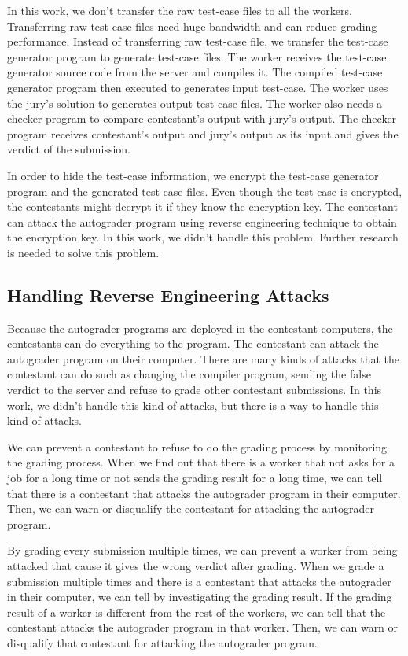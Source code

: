 \documentclass[conference]{IEEEtran}
\begin{document}
In this work, we don't transfer the raw test-case files to all the workers. Transferring raw test-case files need huge bandwidth and can reduce grading performance. Instead of transferring raw test-case file, we transfer the test-case generator program to generate test-case files. The worker receives the test-case generator source code from the server and compiles it. The compiled test-case generator program then executed to generates input test-case. The worker uses the jury's solution to generates output test-case files. The worker also needs a checker program to compare contestant's output with jury's output. The checker program receives contestant's output and jury's output as its input and gives the verdict of the submission.

In order to hide the test-case information, we encrypt the test-case generator program and the generated test-case files. Even though the test-case is encrypted, the contestants might decrypt it if they know the encryption key. The contestant can attack the autograder program using reverse engineering technique to obtain the encryption key. In this work, we didn't handle this problem. Further research is needed to solve this problem.

\subsection{Handling Reverse Engineering Attacks}

Because the autograder programs are deployed in the contestant computers, the contestants can do everything to the program. The contestant can attack the autograder program on their computer. There are many kinds of attacks that the contestant can do such as changing the compiler program, sending the false verdict to the server and refuse to grade other contestant submissions. In this work, we didn't handle this kind of attacks, but there is a way to handle this kind of attacks.

We can prevent a contestant to refuse to do the grading process by monitoring the grading process. When we find out that there is a worker that not asks for a job for a long time or not sends the grading result for a long time, we can tell that there is a contestant that attacks the autograder program in their computer. Then, we can warn or disqualify the contestant for attacking the autograder program.

By grading every submission multiple times, we can prevent a worker from being attacked that cause it gives the wrong verdict after grading. When we grade a submission multiple times and there is a contestant that attacks the autograder in their computer, we can tell by investigating the grading result. If the grading result of a worker is different from the rest of the workers, we can tell that the contestant attacks the autograder program in that worker. Then, we can warn or disqualify that contestant for attacking the autograder program.
\end{document}
